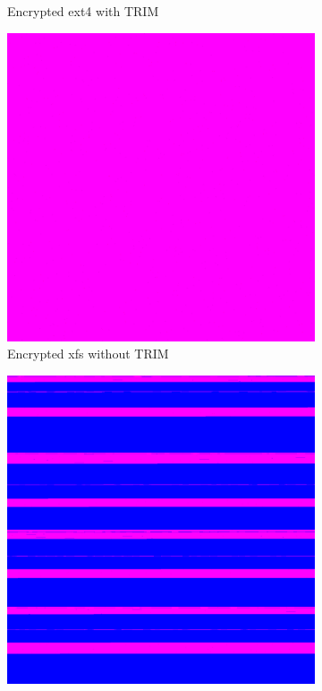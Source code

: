 \documentclass[
  digital, %
  oneside, %
  lof,     %
  lot,     %
]{fithesis4}
\begin{document}
\begin{figure}
\begin{subfigure}[t]{0.45\textwidth}
    \caption{Encrypted ext4 with TRIM}
    \label{fig:trim-ext4-trim}
  \end{subfigure}
  \begin{subfigure}[b]{0.45\textwidth}
    \centering
    \includegraphics[width=\textwidth,interpolate=false]{figures/test-xfs-no-trim-chi2-4-sweeping.png}
    \caption{Encrypted xfs without TRIM}
    \label{fig:trim-xfs-no-trim}
  \end{subfigure}
  \hfill
  \begin{subfigure}[b]{0.45\textwidth}
    \centering
    \includegraphics[width=\textwidth,interpolate=false]{figures/test-xfs-chi2-4-sweeping.png}

\end{subfigure}
\end{figure}
\end{document}
